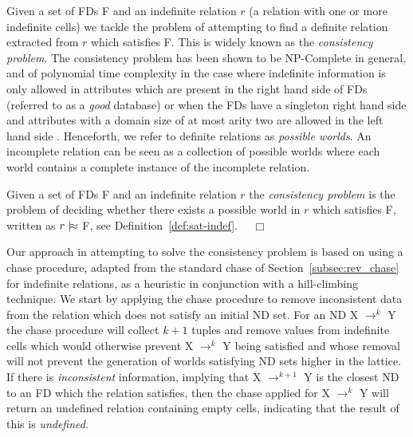 Given a set of FDs F and an indefinite relation $r$ (a relation with one or
more indefinite cells) we tackle the problem of attempting
to find a definite relation extracted from $r$ which satisfies F.
This is widely known as the {\em consistency problem}.  
The consistency
problem has been shown to be NP-Complete in general, and of 
polynomial time complexity in the case where indefinite information is
only allowed in attributes which are present in the right hand side of
FDs (referred to as a {\em good} database) or when the FDs have a
singleton right hand side and attributes with a domain size of
at most arity two are allowed in the left hand side \cite{vn95}. 
 Henceforth, we refer to definite relations as {\em possible worlds}.
An incomplete relation can be seen as a collection of possible worlds
where each world contains a complete instance of the incomplete
relation. 
\begin{definition}\label{def:cons}
\begin{rm}
Given a set of FDs F and an indefinite relation $r$ the {\em consistency problem}
is the problem of deciding whether there exists a possible world in
$r$ which satisfies F, written as $r \mid\!\approx$ F, see Definition~\ref{def:sat-indef}. $\quad\Box$
\end{rm}
\end{definition}


Our approach in attempting to solve the consistency problem is based on using
a chase procedure, adapted from the standard chase of
Section~\ref{subsec:rev_chase} for indefinite relations, as a
heuristic in conjunction with a hill-climbing 
technique. We start by applying the chase procedure to remove
inconsistent data from the relation which does not satisfy an
initial ND set. For an ND X $\to^k$ Y the chase procedure will
collect $k + 1$ tuples and remove values from indefinite cells
which would otherwise prevent X $\to^k$ Y being satisfied and whose
removal will not prevent the generation of worlds satisfying ND sets
higher in the lattice.
If there is {\em inconsistent} information, implying that 
X $\to^{k+1}$ Y is
the closest ND to an FD which the relation satisfies, then the
chase applied for \linebreak X $\to^k$ Y will return an undefined relation
containing empty cells, indicating that the result of this is {\em undefined}.

\smallskip

